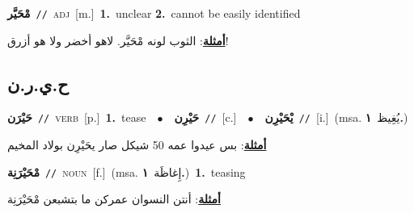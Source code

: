 \documentclass[10pt,a4paper,twoside]{article} %
\begin{document}
\begin{multicols}{2}
{\setlength\topsep{0pt}\textbf{\foreignlanguage{arabic}{مْحَيَّر}}\ {\color{gray}\texttt{//}\color{black}}\ \textsc{adj}\ [m.]\ \textbf{1.}~unclear  \textbf{2.}~cannot be easily identified\  \begin{flushright}\color{gray}\foreignlanguage{arabic}{\textbf{\underline{\foreignlanguage{arabic}{أمثلة}}}: الثوب لونه مْحَيَّر. لاهو أخضر ولا هو أزرق!}\end{flushright}\color{black}} \vspace{2mm}

\vspace{-3mm}
\subsection*{\color{blue}\foreignlanguage{arabic}{ح.ي.ر.ن}\color{blue}{}} 

{\setlength\topsep{0pt}\textbf{\foreignlanguage{arabic}{حَيْرَن}}\ {\color{gray}\texttt{//}\color{black}}\ \textsc{verb}\ [p.]\ \textbf{1.}~tease\ \ $\bullet$\ \ \setlength\topsep{0pt}\textbf{\foreignlanguage{arabic}{حَيْرِن}}\ {\color{gray}\texttt{//}\color{black}}\ [c.]\ \ $\bullet$\ \ \setlength\topsep{0pt}\textbf{\foreignlanguage{arabic}{يْحَيْرِن}}\ {\color{gray}\texttt{//}\color{black}}\ [i.]\ \color{gray}(msa. \foreignlanguage{arabic}{يُغِيظ}~\foreignlanguage{arabic}{\textbf{١.}})\color{black}\  \begin{flushright}\color{gray}\foreignlanguage{arabic}{\textbf{\underline{\foreignlanguage{arabic}{أمثلة}}}: بس عيدوا عمه 50 شيكل صار يحَيْرِن بولاد المخيم}\end{flushright}\color{black}} \vspace{2mm}

{\setlength\topsep{0pt}\textbf{\foreignlanguage{arabic}{مْحَيْرَنِة}}\ {\color{gray}\texttt{//}\color{black}}\ \textsc{noun}\ [f.]\ \color{gray}(msa. \foreignlanguage{arabic}{إِغاظَة}~\foreignlanguage{arabic}{\textbf{١.}})\color{black}\ \textbf{1.}~teasing\  \begin{flushright}\color{gray}\foreignlanguage{arabic}{\textbf{\underline{\foreignlanguage{arabic}{أمثلة}}}: أنتن النسوان عمركن ما بتشبعن مْحَيْرَنِة}\end{flushright}\color{black}} \vspace{2mm}


\end{multicols}
\end{document}
